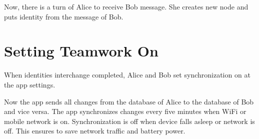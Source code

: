 \documentclass[a4paper,10pt,english]{sphinxmanual}
\begin{document}
\noindent{}

\noindent{}

\noindent{}

\noindent{}

\noindent{}

\sphinxAtStartPar
Now, there is a turn of Alice to receive Bob message. She creates new node and puts identity
from the message of Bob.


\section{Setting Teamwork On}
\label{\detokenize{teamwork:setting-teamwork-on}}
\sphinxAtStartPar
When identities interchange completed, Alice and Bob set synchronization on at the app settings.

\noindent{}

\noindent{}

\noindent{}

\noindent{}

\sphinxAtStartPar
Now the app sends all changes from the database of Alice to the database of Bob and vice versa.
The app synchronizes changes every five minutes when Wi\sphinxhyphen{}Fi or mobile network is on. Synchronization
is off when device falls asleep or network is off. This ensures to save network traffic and
battery power.
\end{document}

